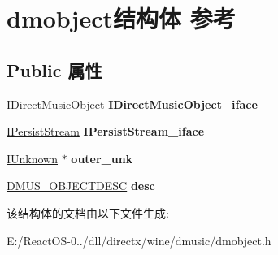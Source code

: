 \hypertarget{structdmobject}{}\section{dmobject结构体 参考}
\label{structdmobject}
\subsection*{Public 属性}
\begin{DoxyCompactItemize}
\item 
\mbox{\label{structdmobject_acf2b5e8b57c8ba1881e06ac238e50801}} 
I\+Direct\+Music\+Object {\bfseries I\+Direct\+Music\+Object\+\_\+iface}
\item 
\mbox{\label{structdmobject_a3d201700e0ccddfccf989766f1a74afa}} 
\hyperlink{interface_i_persist_stream}{I\+Persist\+Stream} {\bfseries I\+Persist\+Stream\+\_\+iface}
\item 
\mbox{\label{structdmobject_ab7179aa79f7a5ee771d3f513aa027ab3}} 
\hyperlink{interface_i_unknown}{I\+Unknown} $\ast$ {\bfseries outer\+\_\+unk}
\item 
\mbox{\label{structdmobject_aa7ed81107686d09be1daad275a217be7}} 
\hyperlink{struct___d_m_u_s___o_b_j_e_c_t_d_e_s_c}{D\+M\+U\+S\+\_\+\+O\+B\+J\+E\+C\+T\+D\+E\+SC} {\bfseries desc}
\end{DoxyCompactItemize}


该结构体的文档由以下文件生成\+:\begin{DoxyCompactItemize}
\item 
E\+:/\+React\+O\+S-\/0../dll/directx/wine/dmusic/dmobject.\+h\end{DoxyCompactItemize}
